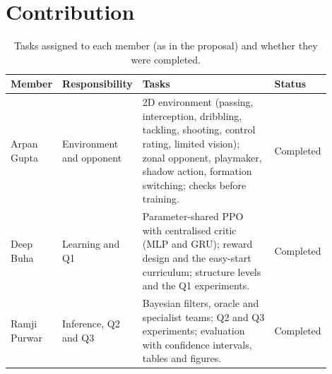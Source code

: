 \documentclass{article}
\begin{document}
\section{Contribution}
\label{sec:contrib}

\begin{table}[H]
\caption{Tasks assigned to each member (as in the proposal) and whether they were completed.}
\label{tab:contrib}
\centering
\small
\begin{tabular}{>{\raggedright\arraybackslash}p{0.12\linewidth}>{\raggedright\arraybackslash}p{0.15\linewidth}>{\raggedright\arraybackslash}p{0.535\linewidth}p{0.09\linewidth}}
\toprule
Member & Responsibility & Tasks & Status \\
\midrule
Arpan Gupta & Environment and opponent & 2D environment (passing, interception, dribbling, tackling, shooting, control
rating, limited vision); zonal opponent, playmaker, shadow action, formation switching; checks before training. &
Completed \\
Deep Buha & Learning and Q1 & Parameter-shared PPO with centralised critic (MLP and GRU); reward design and the
easy-start curriculum; structure levels and the Q1 experiments. & Completed \\
Ramji Purwar & Inference, Q2 and Q3 & Bayesian filters, oracle and specialist teams; Q2 and Q3 experiments; evaluation
with confidence intervals, tables and figures. & Completed \\
\bottomrule
\end{tabular}
\end{table}

{\footnotesize
\setlength{\itemsep}{0pt}


}

\appendix
\end{document}
